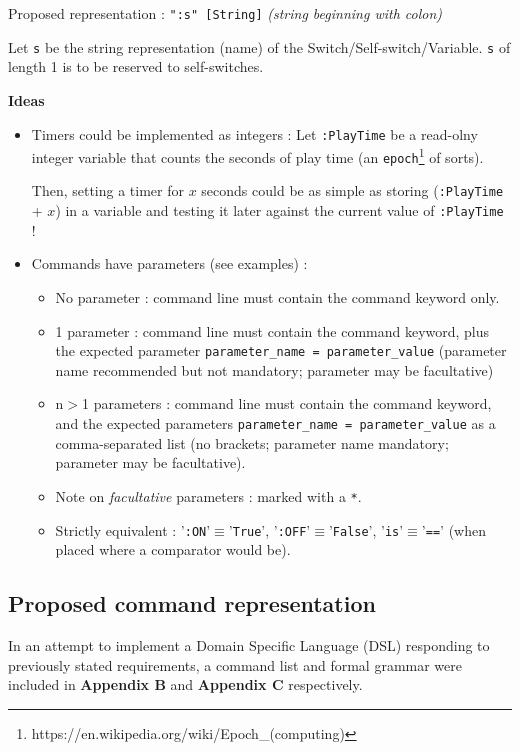 \documentclass[11pt]{article}
\begin{document}
{Proposed representation : \verb|":s" [String]| \textit{(string beginning with colon)}

Let \verb|s| be the string representation (name) of the Switch/Self-switch/Variable. \verb|s| of length 1 is to be reserved to self-switches.


\textbf{Ideas}
\begin{itemize}
	\item Timers could be implemented as integers : Let \verb|:PlayTime| be a read-olny integer variable that counts the seconds of play time (an \texttt{epoch}\footnote{https://en.wikipedia.org/wiki/Epoch\_(computing)} of sorts).
	
	Then, setting a timer for $x$ seconds could be as simple as storing (\verb|:PlayTime| + $x$) in a variable and testing it later against the current value of \verb|:PlayTime| !
	
	\item Commands have parameters (see examples) :
	\begin{itemize}
		\item No parameter : command line must contain the command keyword only.
		\item 1 parameter : command line must contain the command keyword, plus the expected parameter \verb|parameter_name = parameter_value| (parameter name recommended but not mandatory; parameter may be facultative)
		\item n$>$1 parameters : command line must contain the command keyword, and the expected parameters \verb|parameter_name = parameter_value| as a comma-separated list (no brackets; parameter name mandatory; parameter may be facultative).
		\item Note on \textit{facultative} parameters : marked with a \verb|*|.
		\item Strictly equivalent : '\verb|:ON|'$\equiv$'\verb|True|', '\verb|:OFF|'$\equiv$'\verb|False|', '\verb|is|'$\equiv$'\verb|==|' (when placed where a comparator would be).
	\end{itemize}
\end{itemize}


\subsection{Proposed command representation}

In an attempt to implement a Domain Specific Language (DSL) responding to previously stated requirements, a command list and formal grammar were included in \textbf{Appendix B} and \textbf{Appendix C} respectively.

}
\end{document}
